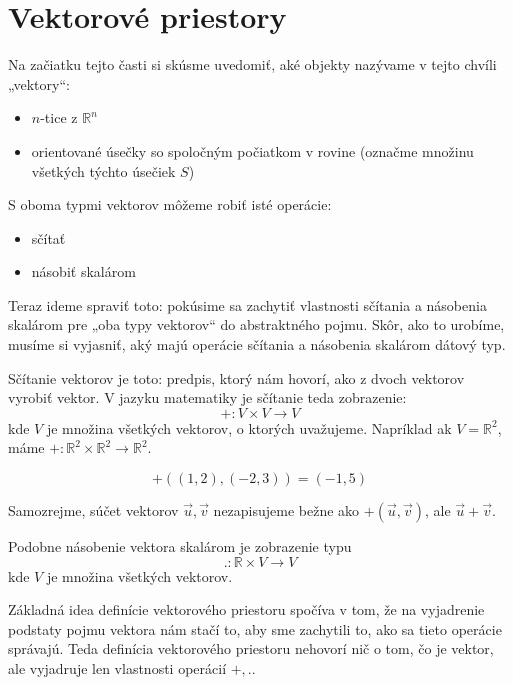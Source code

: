 \documentclass{article}
\theoremstyle{definition}
\theoremstyle{plain}
\begin{document}
\section{Vektorové priestory}

Na začiatku tejto časti si skúsme uvedomiť, aké objekty nazývame v tejto chvíli
„vektory“:
\begin{itemize}
    \item $n$-tice z $\mathbb{R}^n$
    \item orientované úsečky so spoločným počiatkom v rovine (označme množinu všetkých týchto úsečiek $S$)
\end{itemize}
S oboma typmi vektorov môžeme robiť isté operácie:
\begin{itemize}
    \item sčítať
    \item násobiť skalárom
\end{itemize}
Teraz ideme spraviť toto: pokúsime sa zachytiť vlastnosti sčítania a násobenia skalárom pre „oba typy vektorov“ do abstraktného pojmu. Skôr, ako to urobíme, musíme si vyjasniť, aký majú operácie sčítania a násobenia skalárom dátový typ.

Sčítanie vektorov je toto: predpis, ktorý nám hovorí, ako z dvoch vektorov vyrobiť vektor. V jazyku matematiky je sčítanie teda zobrazenie:
$$ + : V \times V \longrightarrow V $$
kde $V$ je množina všetkých vektorov, o ktorých uvažujeme. Napríklad ak $V = \mathbb{R}^2$, máme $+ : \mathbb{R}^2 \times \mathbb{R}^2 \longrightarrow \mathbb{R}^2$.

$$ +((1,2), (-2,3)) = (-1, 5) $$

Samozrejme, súčet vektorov $\vec{u}, \vec{v}$ nezapisujeme bežne ako $+(\vec{u}, \vec{v})$, ale $\vec{u} + \vec{v}$.

Podobne násobenie vektora skalárom je zobrazenie typu
$$ . : \mathbb{R} \times V \longrightarrow V $$
kde $V$ je množina všetkých vektorov.

Základná idea definície vektorového priestoru spočíva v tom, že na vyjadrenie podstaty pojmu vektora nám stačí to, aby sme zachytili to, ako sa tieto operácie správajú.
Teda definícia vektorového priestoru nehovorí nič o tom, čo je vektor, ale vyjadruje len vlastnosti operácií $+, .$.
\end{document}
